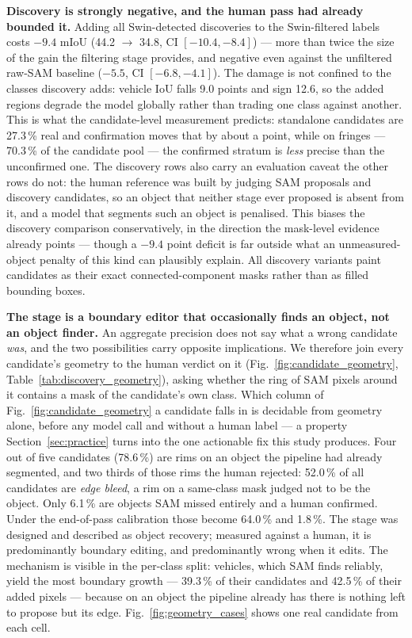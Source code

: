 \documentclass[conference]{IEEEtran}
\begin{document}
\textbf{Discovery is strongly negative, and the human pass had already bounded it.}
Adding all Swin-detected discoveries to the Swin-filtered labels costs $-9.4$ mIoU
(44.2 $\to$ 34.8, CI $[-10.4, -8.4]$) --- more than twice the size of the gain the filtering stage
provides, and negative even against the unfiltered raw-SAM baseline ($-5.5$, CI $[-6.8, -4.1]$). The
damage is not confined to the classes discovery adds: vehicle IoU falls 9.0 points and sign 12.6, so
the added regions degrade the model globally rather than trading one class against another. This is
what the candidate-level measurement predicts: standalone candidates are 27.3\,\% real and
confirmation moves that by about a point, while on fringes --- 70.3\,\% of the candidate pool --- the
confirmed stratum is \emph{less} precise than the unconfirmed one.
The discovery rows also carry an evaluation caveat the other rows do not: the human reference was
built by judging SAM proposals and discovery candidates, so an object that neither stage ever proposed
is absent from it, and a model that segments such an object is penalised. This biases the discovery
comparison conservatively, in the direction the mask-level evidence already points --- though a
$-9.4$ point deficit is far outside what an unmeasured-object penalty of this kind can plausibly
explain.
All discovery variants paint candidates as their exact connected-component masks rather than as filled
bounding boxes.

\textbf{The stage is a boundary editor that occasionally finds an object, not an object finder.}
An aggregate precision does not say what a wrong candidate \emph{was}, and the two possibilities carry
opposite implications. We therefore join every candidate's geometry to the human verdict on it
(Fig.~\ref{fig:candidate_geometry}, Table~\ref{tab:discovery_geometry}), asking whether the ring of
SAM pixels around it contains a mask of the candidate's own class. Which column of
Fig.~\ref{fig:candidate_geometry} a candidate falls in is decidable from geometry alone, before any
model call and without a human label --- a property Section~\ref{sec:practice} turns into the one
actionable fix this study produces.
Four out of five candidates (78.6\,\%) are rims on an object the pipeline had already segmented, and
two thirds of those rims the human rejected: 52.0\,\% of all candidates are \emph{edge bleed}, a rim
on a same-class mask judged not to be the object. Only 6.1\,\% are objects SAM missed entirely and a
human confirmed. Under the end-of-pass calibration those become 64.0\,\% and 1.8\,\%.
The stage was designed and described as object recovery; measured against a human, it is
predominantly boundary editing, and predominantly wrong when it edits.
The mechanism is visible in the per-class split: vehicles, which SAM finds reliably, yield the most
boundary growth --- 39.3\,\% of their candidates and 42.5\,\% of their added pixels --- because on an
object the pipeline already has there is nothing left to propose but its edge.
Fig.~\ref{fig:geometry_cases} shows one real candidate from each cell.
\end{document}
